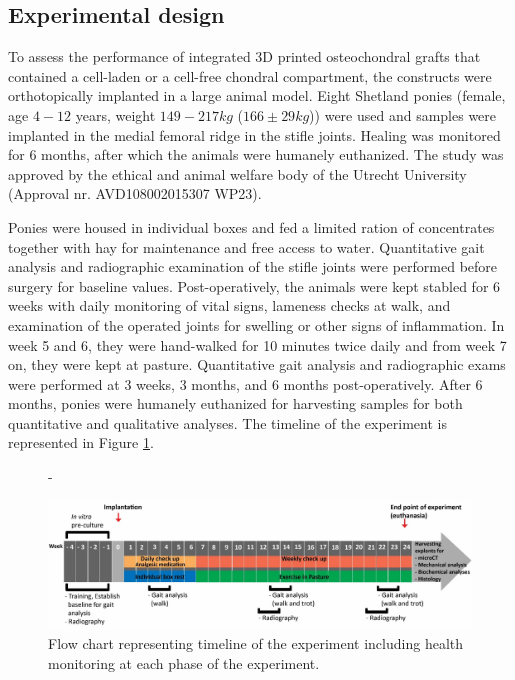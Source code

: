 \documentclass[twocolumn, empirical, authordate, issue]{jote-new-article}
\begin{document}
\subsection{Experimental design} 

To assess the performance of integrated 3D printed osteochondral grafts that contained a cell-laden or a cell-free chondral compartment, the constructs were orthotopically implanted in a large animal model. Eight Shetland ponies (female, age $4-12$ years, weight $149 - 217 kg$ ($166 \pm 29 kg$)) were used and samples were implanted in the medial femoral ridge in the stifle joints. Healing was monitored for 6 months, after which the animals were humanely euthanized. The study was approved by the ethical and animal welfare body of the Utrecht University (Approval nr. AVD108002015307 WP23).

Ponies were housed in individual boxes and fed a limited ration of concentrates together with hay for maintenance and free access to water. Quantitative gait analysis and radiographic examination of the stifle joints were performed before surgery for baseline values. Post-operatively, the animals were kept stabled for 6 weeks with daily monitoring of vital signs, lameness checks at walk, and examination of the operated joints for swelling or other signs of inflammation. In week 5 and 6, they were hand-walked for 10 minutes twice daily and from week 7 on, they were kept at pasture. Quantitative gait analysis and radiographic exams were performed at 3 weeks, 3 months, and 6 months post-operatively. After 6 months, ponies were humanely euthanized for harvesting samples for both quantitative and qualitative analyses. The timeline of the experiment is represented in Figure \ref{fig:figure1}.

\begin{figure}[t]
\begin{adjustwidth}{-\fullwidthlen}{}


 \includegraphics[width=\textwidth+\fullwidthlen]{media/image1.jpg}
\caption{Flow chart representing timeline of the experiment including health monitoring at each phase of the experiment.}
\label{fig:figure1}
\end{adjustwidth}

\end{figure}
\end{document}

